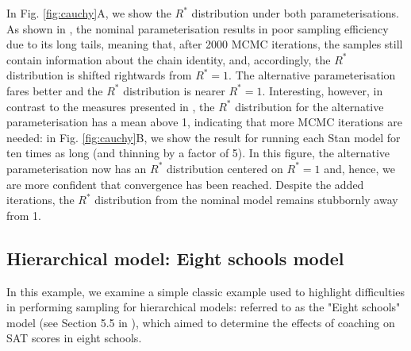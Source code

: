\documentclass{article}
\begin{document}
In Fig. \ref{fig:cauchy}A, we show the $R^*$ distribution under both parameterisations. As shown in \cite{vehtari2019rank}, the nominal parameterisation results in poor sampling efficiency due to its long tails, meaning that, after 2000 MCMC iterations, the samples still contain information about the chain identity, and, accordingly, the $R^*$ distribution is shifted rightwards from $R^*=1$. The alternative parameterisation fares better and the $R^*$ distribution is nearer $R^*=1$. Interesting, however, in contrast to the measures presented in \cite{vehtari2019rank}, the $R^*$ distribution for the alternative parameterisation has a mean above 1, indicating that more MCMC iterations are needed: in Fig. \ref{fig:cauchy}B, we show the result for running each Stan model for ten times as long (and thinning by a factor of 5). In this figure, the alternative parameterisation now has an $R^*$ distribution centered on $R^*=1$ and, hence, we are more confident that convergence has been reached. Despite the added iterations, the $R^*$ distribution from the nominal model remains stubbornly away from 1.


\subsection{Hierarchical model: Eight schools model}\label{sec:eight_shools}
In this example, we examine a simple classic example used to highlight difficulties in performing sampling for hierarchical models: referred to as the "Eight schools" model (see Section 5.5 in \cite{gelman2013bayesian}), which aimed to determine the effects of coaching on SAT scores in eight schools. 
\end{document}

